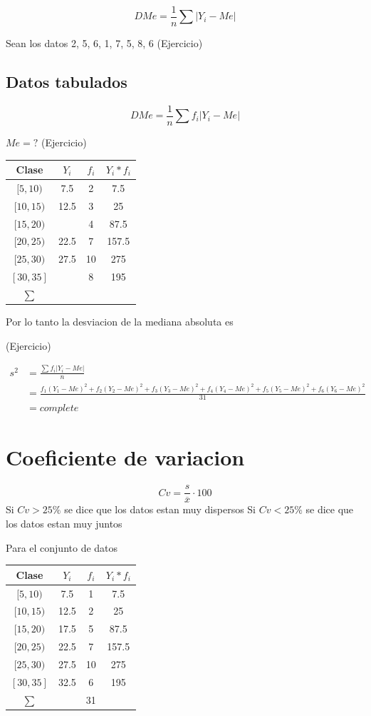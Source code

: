\documentclass[
  11pt,
]{krantz}
\theoremstyle{definition}
\theoremstyle{definition}
\theoremstyle{definition}
\theoremstyle{definition}
\theoremstyle{remark}
\begin{document}
\[DMe=\frac{1}{n}\sum \left\vert Y_i-Me\right\vert\]

Sean los datos 2, 5, 6, 1, 7, 5, 8, 6 (Ejercicio)

\hypertarget{datos-tabulados-2}{%
\subsection{Datos tabulados}\label{datos-tabulados-2}}

\[DMe=\frac{1}{n}\sum f_i \left \vert Y_i-Me\right\vert\]

\(Me=?\) (Ejercicio)

\begin{longtable}[]{@{}cccc@{}}
\toprule
Clase & \(Y_i\) & \(f_i\) & \(Y_i*f_i\) \\
\midrule
\endhead
\([5,10)\) & 7.5 & 2 & 7.5 \\
\([10,15)\) & 12.5 & 3 & 25 \\
\([15,20)\) & & 4 & 87.5 \\
\([20,25)\) & 22.5 & 7 & 157.5 \\
\([25,30)\) & 27.5 & 10 & 275 \\
\([30,35]\) & & 8 & 195 \\
\(\sum\) & & & \\
\bottomrule
\end{longtable}

Por lo tanto la desviacion de la mediana absoluta es

(Ejercicio)

\[
\begin{aligned}
s^2&=\frac{\sum f_i\left \vert Y_i-Me\right \vert}{n}\\
&=\frac{f_1\left(Y_1-Me\right )^2+f_2\left(Y_2-Me\right )^2+f_3\left(Y_3-Me\right )^2+f_4\left(Y_4-Me\right )^2+f_5\left(Y_5-Me\right )^2+f_6\left(Y_6-Me\right )^2}{31}\\
&=complete
\end{aligned}
\]

\hypertarget{coeficiente-de-variacion}{%
\section{Coeficiente de variacion}\label{coeficiente-de-variacion}}

\[Cv=\frac{s}{\overline{x}}\cdot 100\] Si \(Cv>25\%\) se dice que los datos estan muy dispersos Si \(Cv<25\%\) se dice que los datos estan muy juntos

Para el conjunto de datos

\begin{longtable}[]{@{}cccc@{}}
\toprule
Clase & \(Y_i\) & \(f_i\) & \(Y_i*f_i\) \\
\midrule
\endhead
\([5,10)\) & 7.5 & 1 & 7.5 \\
\([10,15)\) & 12.5 & 2 & 25 \\
\([15,20)\) & 17.5 & 5 & 87.5 \\
\([20,25)\) & 22.5 & 7 & 157.5 \\
\([25,30)\) & 27.5 & 10 & 275 \\
\([30,35]\) & 32.5 & 6 & 195 \\
\(\sum\) & & 31 & \\
\bottomrule
\end{longtable}
\end{document}
